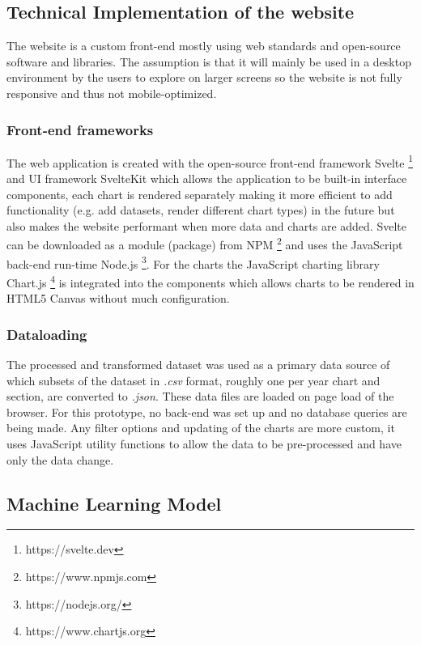 \subsection{Technical Implementation of the website}

The website is a custom front-end mostly using web standards and open-source software and libraries. The assumption is that it will mainly be used in a desktop environment by the users to explore on larger screens so the website is not fully responsive and thus not mobile-optimized. 

\subsubsection{Front-end frameworks}
The web application is created with the open-source front-end framework Svelte \footnote{https://svelte.dev} and UI framework SvelteKit which allows the application to be built-in interface components, each chart is rendered separately making it more efficient to add functionality (e.g. add datasets, render different chart types) in the future but also makes the website performant when more data and charts are added. Svelte can be downloaded as a module (package) from NPM \footnote{https://www.npmjs.com} and uses the JavaScript back-end run-time Node.js \footnote{https://nodejs.org/}. For the charts the JavaScript charting library Chart.js \footnote{https://www.chartjs.org} is integrated into the components which allows charts to be rendered in HTML5 Canvas without much configuration. 

\subsubsection{Dataloading}
The processed and transformed dataset was used as a primary data source of which subsets of the dataset in \textit{.csv} format, roughly one per year chart and section, are converted to \textit{.json}. These data files are loaded on page load of the browser. For this prototype, no back-end was set up and no database queries are being made. Any filter options and updating of the charts are more custom, it uses JavaScript utility functions to allow the data to be pre-processed and have only the data change. 

\subsection{Machine Learning Model}
